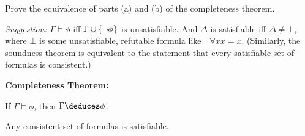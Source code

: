 \begin{problem}[2]
  Prove the equivalence of parts (a) and (b) of the completeness theorem.

  \step
  \emph{Suggestion: } $\Gamma \models \phi$ iff $\Gamma \cup \left\{\lnot \phi\right\}$
    is unsatisfiable. And $\Delta$ is satisfiable iff $\Delta \ne \bot$,
    where $\bot$ is some unsatisfiable, refutable formula
    like $\lnot \forall x x = x$.
    (Similarly, the soundness theorem is equivalent to the statement
    that every satisfiable set of formulas is consistent.)
    \begin{blockcolor}
      \textbf{Completeness Theorem: }
      \begin{enumalph}
        \item If $\Gamma \models \phi$, then $\Gamma \deduces \phi$.
        \item Any consistent set of formulas is satisfiable.
      \end{enumalph}
    \end{blockcolor}
\end{problem}

